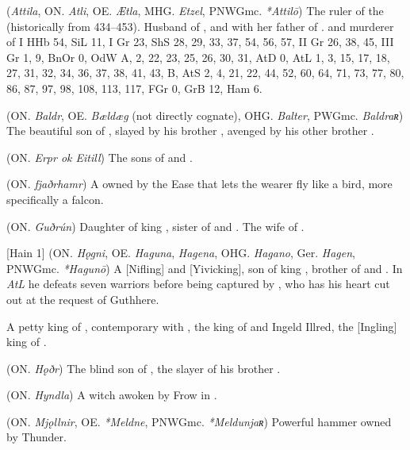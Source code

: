 \begin{itemize}

 (\emph{Attila}, ON. \emph{Atli}, OE. \emph{Ætla}, MHG. \emph{Etzel}, PNWGmc. \emph{*Attilō})
  The ruler of the  (historically from 434–453). Husband of , and with her father of . and murderer of
  I HHb 54, SiL 11, I Gr 23, ShS 28, 29, 33, 37, 54, 56, 57, II Gr 26, 38, 45, III Gr 1, 9, BnOr 0, OdW A, 2, 22, 23, 25, 26, 30, 31, AtD 0, AtL 1, 3, 15, 17, 18, 27, 31, 32, 34, 36, 37, 38, 41, 43, B, AtS 2, 4, 21, 22, 44, 52, 60, 64, 71, 73, 77, 80, 86, 87, 97, 98, 108, 113, 117, FGr 0, GrB 12, Ham 6.

 (ON. \emph{Baldr}, OE. \emph{Bældæg} (not directly cognate), OHG. \emph{Balter}, PWGmc. \emph{Baldraʀ})
  The beautiful son of , slayed by his brother , avenged by his other brother .

 (ON. \emph{Erpr ok Eitill})
  The sons of  and .

 (ON. \emph{fjaðrhamr})
  A  owned by the Ease that lets the wearer fly like a bird, more specifically a falcon.

 (ON. \emph{Guðrún})
  Daughter of king , sister of  and . The wife of .

[Hain 1] (ON. \emph{Hǫgni}, OE. \emph{Haguna}, \emph{Hagena}, OHG. \emph{Hagano}, Ger. \emph{Hagen}, PNWGmc. \emph{*Hagunō})
  A [Nifling] and [Yivicking], son of king , brother of  and . In \emph{AtL} he defeats seven warriors before being captured by , who has his heart cut out at the request of Guthhere.

  A petty king of , contemporary with , the king of  and Ingeld Illred, the [Ingling] king of .

 (ON. \emph{Hǫðr})
  The blind son of , the slayer of his brother .

 (ON. \emph{Hyndla}) A witch awoken by Frow in \Hyndluljod.

 (ON. \emph{Mjǫllnir}, OE. \emph{*Meldne}, PNWGmc. \emph{*Meldunjaʀ})
  Powerful hammer owned by Thunder.


\end{itemize}

